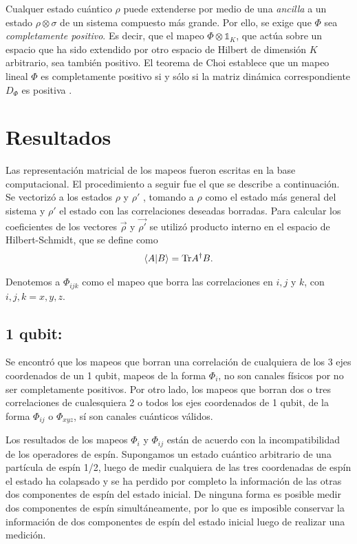 \documentclass[11pt]{article}
\begin{document}
Cualquer estado cuántico $\rho$ puede extenderse por medio de una \textit{ancilla} a un estado $\rho \otimes \sigma$ de un sistema compuesto más grande. Por ello, se exige que $\Phi$ sea \textit{completamente positivo}. Es decir, que el mapeo $\Phi \otimes \mathbb{1}_K$, que actúa sobre un espacio que ha sido extendido por otro espacio de Hilbert de dimensión $K$ arbitrario, sea también positivo. El teorema de Choi establece que un mapeo lineal $\Phi$ es completamente positivo si y sólo si la matriz dinámica correspondiente $D_{\Phi}$ es positiva \cite{bengtsson2017geometry}. 

\section*{Resultados}
Las representación matricial de los mapeos fueron escritas en la base computacional. El procedimiento a seguir fue el que se describe a continuación. Se vectorizó a los estados $\rho$ y $\rho '$ \cite{gilchrist2009vectorization},  tomando a $\rho$ como el estado más general del sistema y $\rho '$ el estado con las correlaciones deseadas borradas. Para calcular los coeficientes de los vectores $\vec{\rho}$ y $\vec{\rho '}$ se utilizó producto interno en el espacio de Hilbert-Schmidt, que se define como 
	\begin{align}
		\ip{A}{B} = \text{Tr} A^{\dagger}B.
	\end{align}
	
\noindent Denotemos a $\Phi _{ijk}$ como el mapeo que borra las correlaciones en $i,j$ y $k$, con $i,j,k=x,y,z$.
\subsection*{1 qubit:}
Se encontró que los mapeos que borran una correlación de cualquiera de los 3 ejes coordenados de un 1 qubit, mapeos de la forma $\Phi _i$, no son canales físicos por no ser completamente positivos. Por otro lado, los mapeos que borran dos o tres correlaciones de cualesquiera 2 o todos los ejes coordenados de 1 qubit, de la forma $\Phi _{ij}$ o $\Phi _{xyz}$, sí son canales cuánticos válidos.

Los resultados de los mapeos $\Phi _{i}$ y $\Phi _{ij}$ están de acuerdo con la incompatibilidad de los operadores de espín. Supongamos un estado cuántico arbitrario de una partícula de espín 1/2, luego de medir cualquiera de las tres coordenadas de espín el estado ha colapsado y se ha perdido por completo la información de las otras dos componentes de espín del estado inicial. De ninguna forma es posible medir dos componentes de espín simultáneamente, por lo que es imposible conservar la información de dos componentes de espín del estado inicial luego de realizar una medición.
\end{document}

